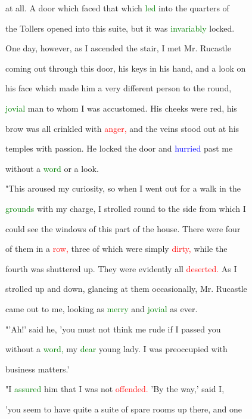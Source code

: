  at all. A door which faced that which \textcolor{green}{led} into the quarters of

 the Tollers opened into this suite, but it was \textcolor{green}{invariably} locked.

 One day, however, as I ascended the stair, I met Mr. Rucastle

 coming out through this door, his keys in his hand, and a look on

 his face which made him a very different person to the round,

 \textcolor{green}{jovial} man to whom I was accustomed. His cheeks were red, his

 brow was all crinkled with \textcolor{red}{anger,} and the veins stood out at his

 temples with \textcolor{BurntOrange}{passion.} He locked the door and \textcolor{blue}{hurried} past me

 without a \textcolor{green}{word} or a look.



 "This \textcolor{BurntOrange}{aroused} my \textcolor{BurntOrange}{curiosity,} so when I went out for a walk in the

 \textcolor{green}{grounds} with my charge, I strolled round to the side from which I

 could see the windows of this part of the house. There were four

 of them in a \textcolor{red}{row,} three of which were simply \textcolor{red}{dirty,} while the

 fourth was shuttered up. They were evidently all \textcolor{red}{deserted.} As I

 strolled up and down, glancing at them occasionally, Mr. Rucastle

 came out to me, looking as \textcolor{green}{merry} and \textcolor{green}{jovial} as ever.



 "'Ah!' said he, 'you must not think me rude if I passed you

 without a \textcolor{green}{word,} my \textcolor{green}{dear} \textcolor{BurntOrange}{young} lady. I was preoccupied with

 business matters.'



 "I \textcolor{green}{assured} him that I was not \textcolor{red}{offended.} 'By the way,' said I,

 'you seem to have quite a suite of spare rooms up there, and one

